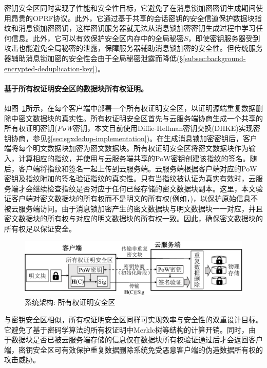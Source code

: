 密钥安全区同时实现了性能和安全性目标，它避免了在消息锁加密密钥生成期间使用昂贵的OPRF协议\cite{bellare2013DupLESS}。此外，它通过基于共享的会话密钥的安全信道保护数据块指纹和消息锁加密密钥，这样密钥服务器就无法从消息锁加密密钥生成过程中学习任何信息。此外，它可以有效保护安全区内存中的全局秘密$S$，即使密钥服务器受到攻击也能避免全局秘密的泄露，保障服务器辅助消息锁加密的安全性。但传统服务器辅助消息锁加密的安全性会由于全局秘密泄露而降低(\S\ref{subsec:background-encrypted-deduplication-key})。



\paragraph*{基于所有权证明安全区的数据块所有权证明。}如图~\ref{fig:sgxdedup-overview-pow}所示，\sysnameS 在每个客户端中部署一个所有权证明安全区，以证明源端重复数据删除中密文数据块的真实性。所有权证明安全区首先与云服务端协商生成一个共享的所有权证明密钥(\textit{PoW}密钥，本文目前使用Diffie-Hellman密钥交换(DHKE)实现密钥协商，参见\S\ref{sec:sgxdedup-implementation})。在生成消息锁加密密钥后，客户端将每个明文数据块加密为密文数据块。所有权证明安全区将密文数据块作为输入，计算相应的指纹，并使用与云服务端共享的PoW密钥创建该指纹的签名。随后，客户端将指纹和签名一起上传到云服务端。云服务端根据客户端对应的PoW密钥及指纹附加的签名验证指纹的真实性。只有当指纹被认证为真实有效时，云服务端才会继续检查指纹是否对应于任何已经存储的密文数据块副本。这里，本文验证客户端对密文数据块的所有权而不是明文的所有权(例如，\cite{halevi11})，以保护原始信息不被云服务端访问。由于消息锁加密产生的密文数据块与明文数据块一一对应，并且密文数据块的所有权与对应的明文数据块的所有权一致。因此，确保密文数据块的所有权足以保证安全。

\begin{figure}[!htb]
    \centering
    \includegraphics[width=\textwidth]{pic/sgxdedup/pow.pdf}
    \caption{\sysnameS 系统架构: 所有权证明安全区}
    \label{fig:sgxdedup-overview-pow}
\end{figure}


与密钥安全区相似，所有权证明安全区同样可实现效率与安全性的双重设计目标。它避免了基于密码学算法的所有权证明中Merkle树等结构的计算开销。同时，由于数据块是否已被云服务端存储的信息仅在数据块所有权验证通过后才会返回客户端，密钥安全区可有效保护重复数据删除系统免受恶意客户端的伪造数据所有权的攻击威胁。

